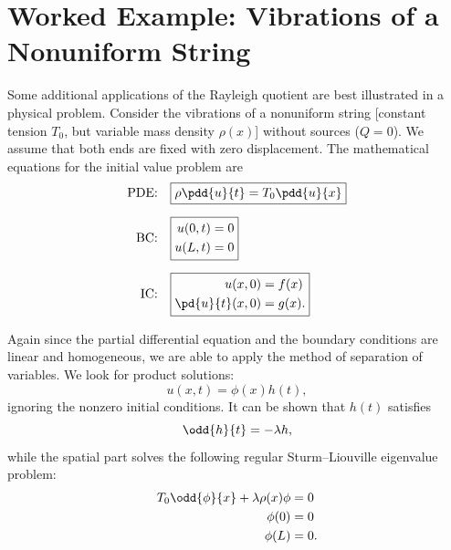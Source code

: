 \section{Worked Example: Vibrations of a Nonuniform String}
\label{sec:sl-vibrating-string}

Some additional applications of the Rayleigh quotient are best illustrated in a physical problem.  Consider the vibrations of a nonuniform string [constant tension $T_0$, but variable mass density $\rho(x)$] without sources ($Q = 0$).  We assume that both ends are fixed with zero displacement.  The mathematical equations for the initial value problem are
\begin{align}
\label{eq:vs-pde}
\text{PDE:}\quad & \boxed{\rho\pdd{u}{t} = T_0\pdd{u}{x}} \\[6pt]
\label{eq:vs-bc}
\text{BC:}\quad & \boxed{\begin{aligned} u(0,t) &= 0 \\ u(L,t) &= 0 \end{aligned}} \\[6pt]
\label{eq:vs-ic}
\text{IC:}\quad & \boxed{\begin{aligned} u(x,0) &= f(x) \\ \pd{u}{t}(x,0) &= g(x). \end{aligned}}
\end{align}

Again since the partial differential equation and the boundary conditions are linear and homogeneous, we are able to apply the method of separation of variables.  We look for product solutions:
\begin{equation}
\label{eq:vs-product}
u(x,t) = \phi(x)h(t),
\end{equation}
ignoring the nonzero initial conditions.  It can be shown that $h(t)$ satisfies
\begin{equation}
\label{eq:vs-time}
\odd{h}{t} = -\lambda h,
\end{equation}
while the spatial part solves the following regular Sturm--Liouville eigenvalue problem:
\begin{equation}
\label{eq:vs-spatial}
\begin{aligned}
T_0\odd{\phi}{x} + \lambda\rho(x)\phi &= 0 \\
\phi(0) &= 0 \\
\phi(L) &= 0.
\end{aligned}
\end{equation}

